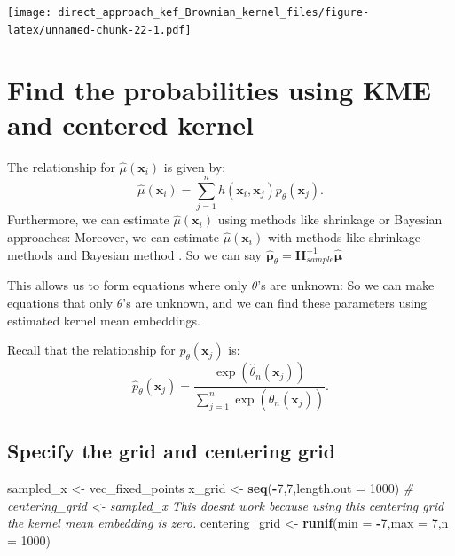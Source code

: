 \documentclass[
]{article}
\newenvironment{Shaded}{\begin{snugshade}}{\end{snugshade}}
\newcommand{\AttributeTok}[1]{\textcolor[rgb]{0.13,0.29,0.53}{#1}}
\newcommand{\CommentTok}[1]{\textcolor[rgb]{0.56,0.35,0.01}{\textit{#1}}}
\newcommand{\DecValTok}[1]{\textcolor[rgb]{0.00,0.00,0.81}{#1}}
\newcommand{\FunctionTok}[1]{\textcolor[rgb]{0.13,0.29,0.53}{\textbf{#1}}}
\newcommand{\NormalTok}[1]{#1}
\newcommand{\OtherTok}[1]{\textcolor[rgb]{0.56,0.35,0.01}{#1}}
\newcommand{\SpecialCharTok}[1]{\textcolor[rgb]{0.81,0.36,0.00}{\textbf{#1}}}
\begin{document}
\texttt{[image: direct\_approach\_kef\_Brownian\_kernel\_files/figure-latex/unnamed-chunk-22-1.pdf]}

\section{Find the probabilities using KME and centered
kernel}\label{find-the-probabilities-using-kme-and-centered-kernel}

The relationship for \(\hat{\mu}(\mathbf{x}_i)\) is given by: \[
    \hat{\mu}(\mathbf{x}_i) = \sum_{j=1}^n h(\mathbf{x}_i, \mathbf{x}_j) p_\theta(\mathbf{x}_j).
\] Furthermore, we can estimate \(\hat{\mu}(\mathbf{x}_i)\) using
methods like shrinkage or Bayesian approaches: Moreover, we can estimate
\(\hat{\mu}(\mathbf{x}_i)\) with methods like shrinkage methods
\citep{muandet2016kernelmeanshrinkageestimators} and Bayesian method
\citep{flaxman2016bayesianlearningkernelembeddings}. So we can say
\(\hat{\mathbf{p}}_\theta = \mathbf{H}_{sample}^{-1} \hat{\boldsymbol{\mu}}\)

This allows us to form equations where only \(\theta\)'s are unknown: So
we can make equations that only \(\theta\)'s are unknown, and we can
find these parameters using estimated kernel mean embeddings.

Recall that the relationship for \(p_\theta(\mathbf{x}_j)\) is: \[
    \hat{p}_\theta(\mathbf{x}_j) = \dfrac{\exp(\hat{\theta}_n(\mathbf{x}_j))}{\sum_{j =1}^n \exp(\hat{\theta}_n(\mathbf{x}_j))}.
\]

\subsection{Specify the grid and centering
grid}\label{specify-the-grid-and-centering-grid}

\begin{Shaded}
\begin{Highlighting}[]
\NormalTok{sampled\_x }\OtherTok{\textless{}{-}}\NormalTok{ vec\_fixed\_points}
\NormalTok{x\_grid }\OtherTok{\textless{}{-}}  \FunctionTok{seq}\NormalTok{(}\SpecialCharTok{{-}}\DecValTok{7}\NormalTok{,}\DecValTok{7}\NormalTok{,}\AttributeTok{length.out =} \DecValTok{1000}\NormalTok{)}
\CommentTok{\# centering\_grid \textless{}{-} sampled\_x This doesn\textquotesingle{}t work because using this centering grid the kernel mean embedding is zero.}
\NormalTok{centering\_grid }\OtherTok{\textless{}{-}} \FunctionTok{runif}\NormalTok{(}\AttributeTok{min =} \SpecialCharTok{{-}}\DecValTok{7}\NormalTok{,}\AttributeTok{max =} \DecValTok{7}\NormalTok{,}\AttributeTok{n =} \DecValTok{1000}\NormalTok{)}
\end{Highlighting}
\end{Shaded}
\end{document}
